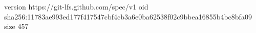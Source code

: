 version https://git-lfs.github.com/spec/v1
oid sha256:11783ae993ed177f417547cbf4cb3a6e0ba62538f02c9bbea16855b4bc8bfa09
size 457
